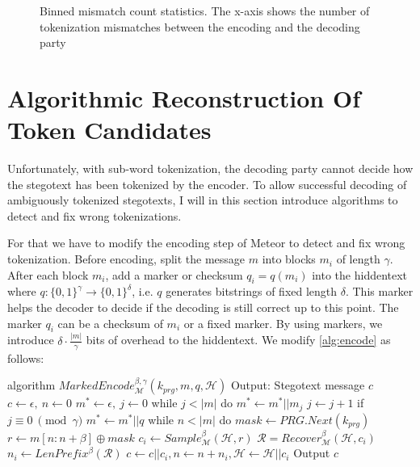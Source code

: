 \begin{figure}[htbp]
	\centering
	
	\caption{Binned mismatch count statistics. The x-axis shows the number of tokenization mismatches between the encoding and the decoding party}
	\label{fig:meteor-stats-mismatch-count}
\end{figure}



\section{Algorithmic Reconstruction Of Token Candidates}
\label{sec:alg-rec-tok-candidates}

Unfortunately, with sub-word tokenization, the decoding party cannot decide how the stegotext has been tokenized by the encoder.
To allow successful decoding of ambiguously tokenized stegotexts, I will in this section introduce algorithms to detect and fix wrong tokenizations. 


For that we have to modify the encoding step of Meteor to detect and fix wrong tokenization.
Before encoding, split the message $m$ into blocks $m_i$ of length $\gamma$.
After each block $m_i$, add a marker or checksum $q_i = q(m_i)$ into the hiddentext where $q \colon \{ 0,1 \}^\gamma \rightarrow \{ 0,1 \}^\delta$, i.e. $q$ generates bitstrings of fixed length $\delta$.
This marker helps the decoder to decide if the decoding is still correct up to this point.
The marker $q_i$ can be a checksum of $m_i$ or a fixed marker.
By using markers, we introduce $\delta \cdot \frac{|m|}{\gamma}$ bits of overhead to the hiddentext.
We modify \autoref{alg:encode} as follows:

\begin{Pseudocode}[float, caption={Marked Encode Algorithm}, label={alg:marked-encode}]
algorithm $MarkedEncode_{\mathcal{M}}^{\beta, \gamma}(k_{prg}, m, q, \mathcal{H})$
	Output: Stegotext message $c$
	$c \leftarrow \epsilon,~ n \leftarrow 0$
	$m^* \leftarrow \epsilon,~ j \leftarrow 0$
	while $j < |m|$ do
		$m^* \leftarrow m^* || m_j$
		$j \leftarrow j + 1$
		if $j \equiv 0~ \pmod \gamma$
			$m^* \leftarrow m^* || q$
	while $n < |m|$ do
		$mask \leftarrow PRG.Next(k_{prg})$
		$r \leftarrow m[n:n+\beta] \oplus mask$
		$c_i \leftarrow Sample_{\mathcal{M}}^\beta(\mathcal{H}, r)$
		$\mathcal{R} = Recover_{\mathcal{M}}^\beta(\mathcal{H}, c_i)$
		$n_i \leftarrow LenPrefix^\beta(\mathcal{R})$
		$c \leftarrow c || c_i, n \leftarrow n+n_i, \mathcal{H} \leftarrow \mathcal{H}||c_i$
	Output $c$
\end{Pseudocode}

